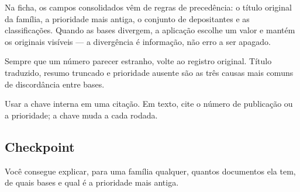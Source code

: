 Na ficha, os campos consolidados vêm de regras de precedência: o título original da família, a
prioridade mais antiga, o conjunto de depositantes e as classificações. Quando as bases divergem, a
aplicação escolhe um valor e mantém os originais visíveis --- a divergência é informação, não erro a
ser apagado.

\begin{nota}
Sempre que um número parecer estranho, volte ao registro original. Título traduzido, resumo truncado
e prioridade ausente são as três causas mais comuns de discordância entre bases.
\end{nota}

\begin{alerta}
Usar a chave interna em uma citação. Em texto, cite o número de publicação ou a prioridade; a chave
muda a cada rodada.
\end{alerta}

\subsection*{Checkpoint}
\marcador\; Você consegue explicar, para uma família qualquer, quantos documentos ela tem, de quais bases
e qual é a prioridade mais antiga.
